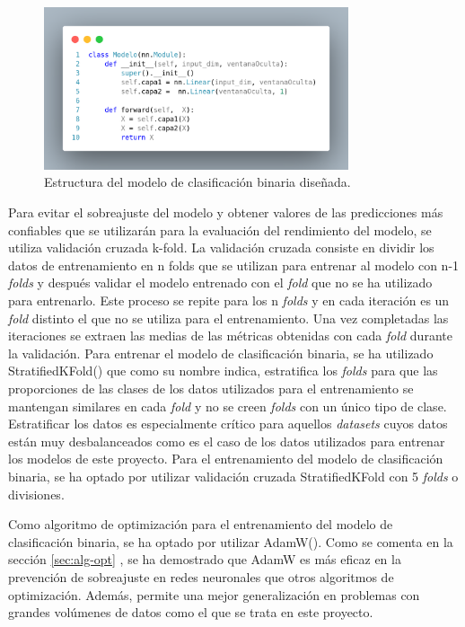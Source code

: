 \begin{figure}[H]
    \centering
    \includegraphics[width=0.8\textwidth]{./img/modelo/modeloBIN.png}
    \caption{Estructura del modelo de clasificación binaria diseñada.}
    \label{fig:modBIN}
\end{figure}

Para evitar el sobreajuste del modelo y obtener valores de las predicciones más confiables que se utilizarán para la evaluación del rendimiento del modelo, se utiliza validación cruzada k-fold. La validación cruzada consiste en dividir los datos de entrenamiento en n folds que se utilizan para entrenar al modelo con n-1 \textit{folds} y después validar el modelo entrenado con el \textit{fold} que no se ha utilizado para entrenarlo. Este proceso se repite para los n \textit{folds} y en cada iteración es un \textit{fold} distinto el que no se utiliza para el entrenamiento. Una vez completadas las iteraciones se extraen las medias de las métricas obtenidas con cada \textit{fold} durante la validación. Para entrenar el modelo de clasificación binaria, se ha utilizado StratifiedKFold() que como su nombre indica, estratifica los \textit{folds} para que las proporciones de las clases de los datos utilizados para el entrenamiento se mantengan similares en cada \textit{fold} y no se creen \textit{folds} con un único tipo de clase. Estratificar los datos es especialmente crítico para aquellos \textit{datasets} cuyos datos están muy desbalanceados como es el caso de los datos utilizados para entrenar los modelos de este proyecto. Para el entrenamiento del modelo de clasificación binaria, se ha optado por utilizar validación cruzada StratifiedKFold con 5 \textit{folds} o divisiones.

Como algoritmo de optimización para el entrenamiento del modelo de clasificación binaria, se ha optado por utilizar AdamW(). Como se comenta en la sección \ref{sec:alg-opt} , se ha demostrado que AdamW es más eficaz en la prevención de sobreajuste en redes neuronales que otros algoritmos de optimización. Además, permite una mejor generalización en problemas con grandes volúmenes de datos como el que se trata en este proyecto.

